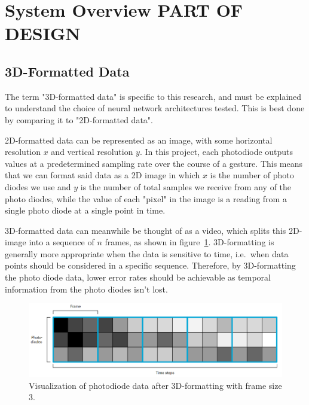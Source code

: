 \section{System Overview PART OF DESIGN}\label{sec:system-overview}
\subsection{3D-Formatted Data}\label{subsec:3d-formatted-data}
The term "3D-formatted data" is specific to this research, and must be explained to understand the choice of neural network architectures tested.
This is best done by comparing it to "2D-formatted data".

2D-formatted data can be represented as an image, with some horizontal resolution $x$ and vertical resolution $y$.
In this project, each photodiode outputs values at a predetermined sampling rate over the course of a gesture.
This means that we can format said data as a 2D image in which $x$ is the number of photo diodes we use and $y$ is the number of total samples we receive from any of the photo diodes, while the value of each "pixel" in the image is a reading from a single photo diode at a single point in time.

3D-formatted data can meanwhile be thought of as a video, which splits this 2D-image into a sequence of $n$ frames, as shown in figure~\ref{fig:3d-data}\@.
3D-formatting is generally more appropriate when the data is sensitive to time, i.e.\ when data points should be considered in a specific sequence.
Therefore, by 3D-formatting the photo diode data, lower error rates should be achievable as temporal information from the photo diodes isn't lost.

\begin{figure}[h]
    \centering
    \captionsetup{justification=centering}
    \includegraphics[width=\linewidth]{figures/3d_data}
    \caption{Visualization of photodiode data after 3D-formatting with frame size 3.}
    \label{fig:3d-data}
\end{figure}


